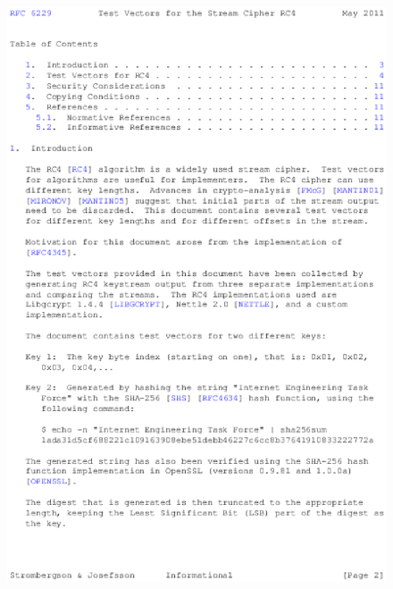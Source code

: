 \begin{anexosenv}
\begin{figure}
\centering
\includegraphics{figuras/file-1}
\end{figure}


\end{anexosenv}
